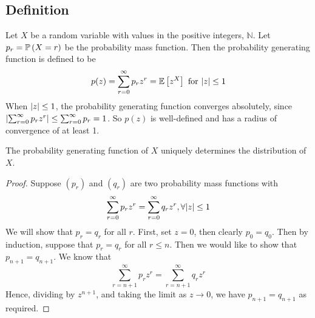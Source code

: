 \subsection{Definition}
Let \(X\) be a random variable with values in the positive integers, \(\mathbb N\).
Let \(p_r = \mathbb{P}\left({X = r}\right)\) be the probability mass function.
Then the probability generating function is defined to be
\[
	p(z) = \sum_{r=0}^\infty p_r z^r = \mathbb{E}\left[{z^X}\right] \text{ for } \abs{z} \leq 1
\]
When \(\abs{z} \leq 1\), the probability generating function converges absolutely, since \(\abs{\sum_{r=0}^\infty p_r z^r} \leq \sum_{r=0}^\infty p_r = 1\).
So \(p(z)\) is well-defined and has a radius of convergence of at least 1.
\begin{theorem}
	The probability generating function of \(X\) uniquely determines the distribution of \(X\).
\end{theorem}
\begin{proof}
	Suppose \((p_r)\) and \((q_r)\) are two probability mass functions with
	\[
		\sum_{r=0}^\infty p_r z^r = \sum_{r=0}^\infty q_r z^r, \forall \abs{z} \leq 1
	\]
	We will show that \(p_r = q_r\) for all \(r\).
	First, set \(z = 0\), then clearly \(p_0 = q_0\).
	Then by induction, suppose that \(p_r = q_r\) for all \(r \leq n\).
	Then we would like to show that \(p_{n+1} = q_{n+1}\).
	We know that
	\[
		\sum_{r=n+1}^\infty p_r z^r = \sum_{r=n+1}^\infty q_r z^r
	\]
	Hence, dividing by \(z^{n+1}\), and taking the limit as \(z \to 0\), we have \(p_{n+1} = q_{n+1}\) as required.
\end{proof}

